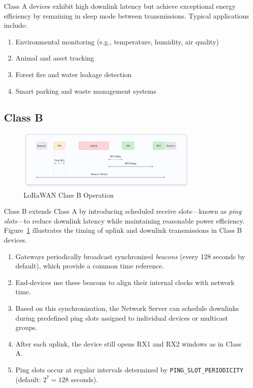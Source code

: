 Class A devices exhibit high downlink latency but achieve exceptional energy efficiency by remaining in sleep mode between transmissions. Typical applications include:

\begin{enumerate}
    \item Environmental monitoring (e.g., temperature, humidity, air quality)
    \item Animal and asset tracking
    \item Forest fire and water leakage detection
    \item Smart parking and waste management systems
\end{enumerate}

\subsection{Class B}
\begin{figure}
    \centering
    \includegraphics[width=0.8\textwidth]{figures/class-b.png}
    \caption{LoRaWAN Class B Operation}
    \label{fig:lora_class_b}
\end{figure}
Class B extends Class A by introducing scheduled receive slots—known as \emph{ping slots}—to reduce downlink latency while maintaining reasonable power efficiency.
Figure~\ref{fig:lora_class_b} illustrates the timing of uplink and downlink transmissions in Class B devices.
\begin{enumerate}
    \item Gateways periodically broadcast synchronized \emph{beacons} (every 128 seconds by default), which provide a common time reference.
    \item End-devices use these beacons to align their internal clocks with network time.
    \item Based on this synchronization, the Network Server can schedule downlinks during predefined ping slots assigned to individual devices or multicast groups.
    \item After each uplink, the device still opens RX1 and RX2 windows as in Class A.
    \item Ping slots occur at regular intervals determined by \texttt{PING\_SLOT\_PERIODICITY} (default: $2^7 = 128$ seconds).
\end{enumerate}

